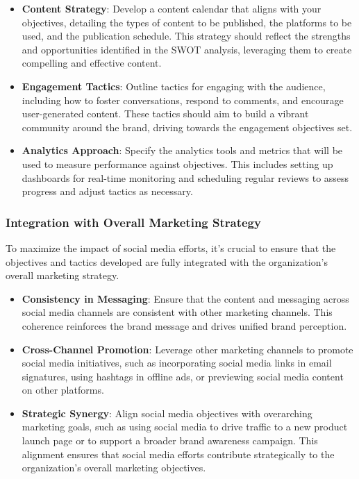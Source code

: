 \documentclass[
]{book}
\providecommand{\tightlist}{%
  \setlength{\itemsep}{0pt}\setlength{\parskip}{0pt}}
\begin{document}
\begin{itemize}
\tightlist
\item
  \textbf{Content Strategy}: Develop a content calendar that aligns with your objectives, detailing the types of content to be published, the platforms to be used, and the publication schedule. This strategy should reflect the strengths and opportunities identified in the SWOT analysis, leveraging them to create compelling and effective content.
\item
  \textbf{Engagement Tactics}: Outline tactics for engaging with the audience, including how to foster conversations, respond to comments, and encourage user-generated content. These tactics should aim to build a vibrant community around the brand, driving towards the engagement objectives set.
\item
  \textbf{Analytics Approach}: Specify the analytics tools and metrics that will be used to measure performance against objectives. This includes setting up dashboards for real-time monitoring and scheduling regular reviews to assess progress and adjust tactics as necessary.
\end{itemize}

\hypertarget{integration-with-overall-marketing-strategy}{%
\subsubsection{Integration with Overall Marketing Strategy}\label{integration-with-overall-marketing-strategy}}

To maximize the impact of social media efforts, it's crucial to ensure that the objectives and tactics developed are fully integrated with the organization's overall marketing strategy.

\begin{itemize}
\tightlist
\item
  \textbf{Consistency in Messaging}: Ensure that the content and messaging across social media channels are consistent with other marketing channels. This coherence reinforces the brand message and drives unified brand perception.
\item
  \textbf{Cross-Channel Promotion}: Leverage other marketing channels to promote social media initiatives, such as incorporating social media links in email signatures, using hashtags in offline ads, or previewing social media content on other platforms.
\item
  \textbf{Strategic Synergy}: Align social media objectives with overarching marketing goals, such as using social media to drive traffic to a new product launch page or to support a broader brand awareness campaign. This alignment ensures that social media efforts contribute strategically to the organization's overall marketing objectives.
\end{itemize}
\end{document}
